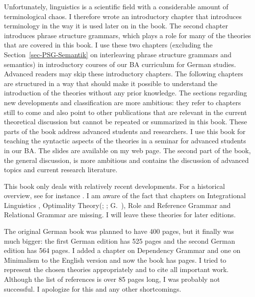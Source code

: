 Unfortunately, linguistics is a scientific field 
with a considerable amount of terminological chaos. I therefore wrote an introductory
chapter that introduces terminology in the way it is used later on in the book. The second chapter
introduces phrase structure grammars, which plays a role for many of the theories that are covered
in this book. I use these two chapters (excluding the Section~\ref{sec-PSG-Semantik} on interleaving
phrase structure grammars and semantics) in introductory courses of our BA curriculum for German
studies. Advanced readers may skip these introductory chapters. The following chapters are
structured in a way that should make it possible to understand the introduction of the theories
without any prior knowledge. The sections\label{page:structure-of-book} regarding new developments and classification are more
ambitious: they refer to chapters still to come and also point to other publications that are
relevant in the current theoretical discussion but cannot be repeated or summarized in this
book. These parts of the book address advanced students and researchers. I use this book for teaching
the syntactic aspects of the theories in a seminar for advanced students in our BA. The slides are
available on my web page. The second part of the book, the general discussion, is more ambitious and contains the discussion
of advanced topics and current research literature.

This book only deals with relatively recent developments. For a historical overview, see for instance
. I am aware of the fact that chapters on
Integrational Linguistics
\citep{Lieb83a-u,Eisenberg2004a,Nolda2007a-u}, Optimality Theory\indexot (\citealp{PS93a-u};
\citealp{Grimshaw97a-u}; G.\ \citealp{GMueller2000a-u}), Role and Reference Grammar \citep{vanValin93a-ed} and Relational Grammar
\citep{Perlmutter83a-ed,PR84a-ed} are missing. I will leave these theories for later editions.

The original German book was planned to have 400 pages, but it finally was much bigger: the first
German edition has 525 pages and the second German edition has 564 pages. I
added a chapter on Dependency Grammar and one on Minimalism to the English version and now the
book has \pageref{LastPage} pages. I tried to represent the chosen theories appropriately and to cite all important work. Although the list of
references is over 85 pages long, I was probably not successful.
I apologize for this and any other shortcomings.

%











